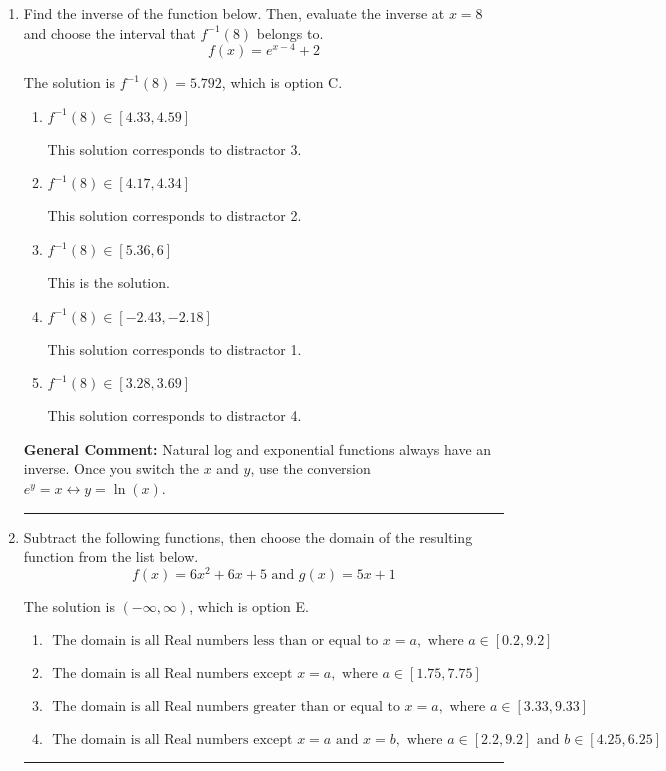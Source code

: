 \documentclass{extbook}[14pt]
\newcommand{\litem}[1]{\item #1

\rule{\textwidth}{0.4pt}}
\begin{document}
\begin{enumerate}\litem{
Find the inverse of the function below. Then, evaluate the inverse at $x = 8$ and choose the interval that $f^{-1}(8)$ belongs to.
\[ f(x) = e^{x-4}+2 \]

The solution is \( f^{-1}(8) = 5.792 \), which is option C.\begin{enumerate}[label=\Alph*.]
\item \( f^{-1}(8) \in [4.33, 4.59] \)

 This solution corresponds to distractor 3.
\item \( f^{-1}(8) \in [4.17, 4.34] \)

 This solution corresponds to distractor 2.
\item \( f^{-1}(8) \in [5.36, 6] \)

 This is the solution.
\item \( f^{-1}(8) \in [-2.43, -2.18] \)

 This solution corresponds to distractor 1.
\item \( f^{-1}(8) \in [3.28, 3.69] \)

 This solution corresponds to distractor 4.
\end{enumerate}

\textbf{General Comment:} Natural log and exponential functions always have an inverse. Once you switch the $x$ and $y$, use the conversion $ e^y = x \leftrightarrow y=\ln(x)$.
}
\litem{
Subtract the following functions, then choose the domain of the resulting function from the list below.
\[ f(x) = 6x^{2} +6 x + 5 \text{ and } g(x) = 5x + 1 \]

The solution is \( (-\infty, \infty) \), which is option E.\begin{enumerate}[label=\Alph*.]
\item \( \text{ The domain is all Real numbers less than or equal to } x = a, \text{ where } a \in [0.2, 9.2] \)


\item \( \text{ The domain is all Real numbers except } x = a, \text{ where } a \in [1.75, 7.75] \)


\item \( \text{ The domain is all Real numbers greater than or equal to } x = a, \text{ where } a \in [3.33, 9.33] \)


\item \( \text{ The domain is all Real numbers except } x = a \text{ and } x = b, \text{ where } a \in [2.2, 9.2] \text{ and } b \in [4.25, 6.25] \)



\end{enumerate}}
\end{enumerate}
\end{document}
